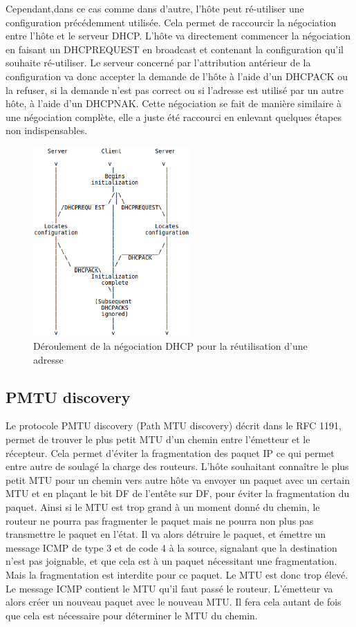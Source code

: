 Cependant,dans ce cas comme dans d'autre, l'hôte peut ré-utiliser une
configuration précédemment utilisée. Cela permet de raccourcir la négociation
entre l'hôte et le serveur DHCP. L'hôte va directement commencer la négociation
en faisant un DHCPREQUEST en broadcast et contenant la configuration qu'il
souhaite ré-utiliser. Le serveur concerné par l'attribution antérieur de la
configuration va donc accepter la demande de l'hôte à l'aide d'un DHCPACK ou la
refuser, si la demande n'est pas correct ou si l'adresse est utilisé par un
autre hôte, à l'aide d'un DHCPNAK.  Cette négociation se fait de manière
similaire à une négociation complète, elle a juste été raccourci en enlevant
quelques étapes non indispensables.

\begin{figure}[h]
\centering
\includegraphics[width=6cm]{./pics/timeline_dhcp_reuse_add.eps}
\caption{Déroulement de la négociation DHCP pour la réutilisation d'une adresse}
\label{fig:timelinedhcpreuseadd}
\end{figure}


\subsection{PMTU discovery}
Le protocole PMTU discovery (Path MTU discovery) décrit dans le RFC 1191\cite{url-RFC-PMTU}, permet de trouver le plus petit MTU d'un chemin entre l'émetteur et le récepteur. Cela permet d'éviter la fragmentation des paquet IP ce qui permet entre autre de soulagé la charge des routeurs.
L'hôte souhaitant connaître le plus petit MTU pour un chemin vers autre hôte va envoyer un paquet avec un certain MTU et en plaçant le bit DF de l'entête sur DF, pour éviter la fragmentation du paquet. Ainsi si le MTU est trop grand à un moment donné du chemin, le routeur ne pourra pas fragmenter le paquet mais ne pourra non plus pas transmettre le paquet en l'état. Il va alors détruire le paquet, et émettre un message ICMP de type 3 et de code 4 à la source, signalant que la destination n'est pas joignable, et que cela est à un paquet nécessitant une fragmentation. Mais la fragmentation est interdite pour ce paquet. Le MTU est donc trop élevé. Le message ICMP contient le MTU qu'il faut passé le routeur.
L'émetteur va alors créer un nouveau paquet avec le nouveau MTU. Il fera cela autant de fois que cela est nécessaire pour déterminer le MTU du chemin.

